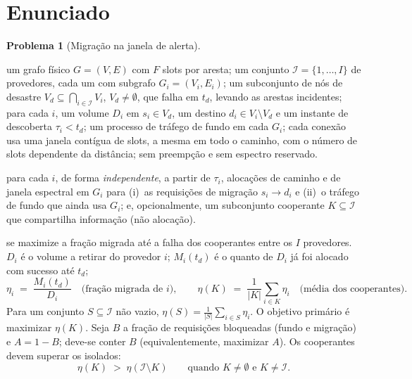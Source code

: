 \documentclass[11pt,a4paper]{article}
\theoremstyle{definition}
\newtheorem{problema}{Problema}
\begin{document}
\section{Enunciado}

\begin{problema}[Migração na janela de alerta]
\label{prob:principal}
\hfill
\begin{description}[leftmargin=1.6cm,style=nextline]
  \item[\textbf{Dado}]
    um grafo físico $G=(V,E)$ com $F$ slots por aresta;
    um conjunto $\mathcal{I}=\{1,\dots,I\}$ de provedores, cada um com subgrafo $G_i=(V_i,E_i)$;
    um subconjunto de nós de desastre $V_d\subseteq\bigcap_{i\in\mathcal{I}} V_i$, $V_d\neq\emptyset$, que falha em $t_d$, levando as arestas incidentes;
    para cada $i$, um volume $D_i$ em $s_i\in V_d$, um destino $d_i\in V_i\setminus V_d$ e um instante de descoberta $\tau_i<t_d$;
    um processo de tráfego de fundo em cada $G_i$;
    cada conexão usa uma janela contígua de slots, a mesma em todo o caminho, com o número de slots dependente da distância;
    sem preempção e sem espectro reservado.

  \item[\textbf{Encontrar}]
    para cada $i$, de forma \emph{independente}, a partir de $\tau_i$, alocações de caminho e de janela espectral em $G_i$ para
    (i)~as requisições de migração $s_i\to d_i$ e
    (ii)~o tráfego de fundo que ainda usa $G_i$;
    e, opcionalmente, um subconjunto cooperante $K\subseteq\mathcal{I}$ que compartilha informação (não alocação).

  \item[\textbf{Tal que}]
    se maximize a fração migrada até a falha dos cooperantes entre os $I$ provedores.
    $D_i$ é o volume a retirar do provedor $i$;
    $M_i(t_d)$ é o quanto de $D_i$ já foi alocado com sucesso até $t_d$;
    \begin{equation}
      \eta_i \;=\; \frac{M_i(t_d)}{D_i}
      \quad\text{(fração migrada de $i$)},
      \qquad
      \eta(K)
      \;=\;
      \frac{1}{|K|}\sum_{i\in K}\eta_i
      \quad\text{(média dos cooperantes)}.
    \end{equation}
    Para um conjunto $S\subseteq\mathcal{I}$ não vazio, $\eta(S)=\frac{1}{|S|}\sum_{i\in S}\eta_i$.
    O objetivo primário é maximizar $\eta(K)$.
    Seja $B$ a fração de requisições bloqueadas (fundo e migração) e $A=1-B$;
    deve-se conter $B$ (equivalentemente, maximizar $A$).
    Os cooperantes devem superar os isolados:
    \begin{equation}
      \eta(K) \;>\; \eta(\mathcal{I}\setminus K)
      \qquad\text{quando }K\neq\emptyset\text{ e }K\neq\mathcal{I}.
    \end{equation}


\end{description}
\end{problema}
\end{document}

